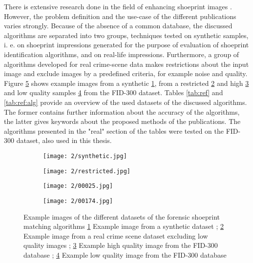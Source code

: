 \documentclass[draft,final]{vutinfth} %
\begin{document}
\par
There is extensive research done in the field of enhancing shoeprint images \cite{rida2019forensic}.
However,  the problem definition and the use-case of the different publications varies strongly.
Because of the absence of a common database, the discussed algorithms are separated into two groups, techniques tested on synthetic samples, i. e. on shoeprint impressions generated for the purpose of evaluation of shoeprint identification algorithms, and on real-life impressions.
Furthermore, a group of algorithms developed for real crime-scene data makes restrictions about the input image and exclude images by a predefined criteria, for example noise and quality.
Figure \ref{fig:rw:database} shows example images from a synthetic \ref{fig:rw:synthetic}, from a restricted \ref{fig:rw:restricted} and high \ref{fig:rw:highFID} and low quality samples \ref{fig:rw:lowFID} from the FID-300 dataset.
Tables \ref{tab:ref} and \ref{tab:ref:alg} provide an overview of the used datasets of the discussed algorithms.
The former contains further information about the accuracy of the algorithms, the latter gives keywords about the proposed methods of the publications.
The algorithms presented in the "real" section of the tables were tested on the FID-300 dataset, also used in this thesis.

\begin{figure}[h]
  \centering
  \begin{subfigure}[t]{0.24\columnwidth}
    \centering
    \texttt{[image: 2/synthetic.jpg]}
    \subcaption{}
    \label{fig:rw:synthetic}
  \end{subfigure}
  \begin{subfigure}[t]{0.24\columnwidth}
    \centering
    \texttt{[image: 2/restricted.jpg]}
    \subcaption{}
    \label{fig:rw:restricted}
  \end{subfigure}
  \begin{subfigure}[t]{0.24\columnwidth}
    \centering
    \texttt{[image: 2/00025.jpg]}
    \subcaption{}
    \label{fig:rw:highFID}
  \end{subfigure}
  \begin{subfigure}[t]{0.24\columnwidth}
    \centering
    \texttt{[image: 2/00174.jpg]}
    \subcaption{}
    \label{fig:rw:lowFID}
  \end{subfigure}
  \caption{Example images of the different datasets of the forensic shoeprint matching algorithms
	\ref{fig:rw:synthetic} Example image from a synthetic dataset \cite{alizadeh2017automatic}; \ref{fig:rw:restricted} Example image from a real crime scene dataset excluding low quality images \cite{li2014retrieval}; \ref{fig:rw:highFID} Example high quality image from the FID-300 database \cite{kortylewski2014unsupervised}; \ref{fig:rw:lowFID} Example low quality image from the FID-300 database \cite{kortylewski2014unsupervised}}
  \label{fig:rw:database}
\end{figure}
\end{document}
